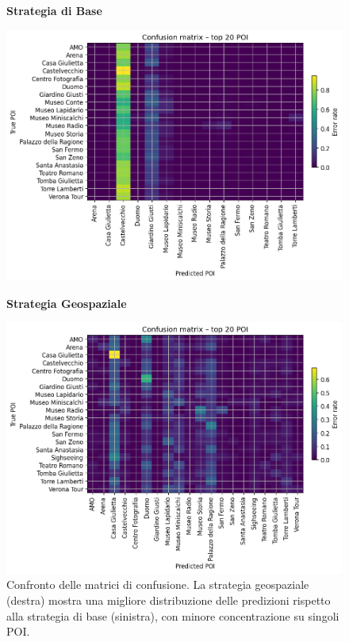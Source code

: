 \begin{figure}[htbp]
\centering
\begin{minipage}{0.48\textwidth}
\centering
\textbf{Strategia di Base}\par
\vspace{0.3em}
\includegraphics[width=\textwidth]{../../img/llama3.1_8b/no_SPACE-GEO_n-1_come_current_POI/confusion_matrix.png}
\end{minipage}
\hfill
\begin{minipage}{0.48\textwidth}
\centering
\textbf{Strategia Geospaziale}\par
\vspace{0.3em}
\includegraphics[width=\textwidth]{../../img/llama3.1_8b/SPACE-GEO_n-1_come_current_POI/confusion_matrix.png}
\end{minipage}
\caption{Confronto delle matrici di confusione. La strategia geospaziale (destra) mostra una migliore distribuzione delle predizioni rispetto alla strategia di base (sinistra), con minore concentrazione su singoli POI.}
\label{fig:confusion_comparison}
\end{figure}

